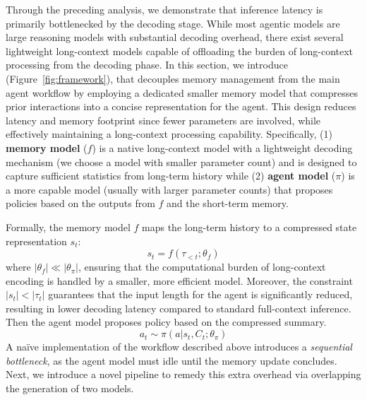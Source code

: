 Through the preceding analysis, we demonstrate that inference latency is primarily bottlenecked by the decoding stage.
While most agentic models are large reasoning models with substantial decoding overhead, there exist several lightweight long-context models capable of offloading the burden of long-context processing from the decoding phase.
In this section, we introduce {\model} (Figure~\ref{fig:framework}), that decouples memory management from the main agent workflow by employing a dedicated smaller memory model that compresses prior interactions into a concise representation for the agent.
This design reduces latency and memory footprint since fewer parameters are involved, while effectively maintaining a long-context processing capability.
Specifically, (1) \textbf{memory model} ($f$) is a native long-context model with a lightweight decoding mechanism (we choose a model with smaller parameter count) and is designed to capture sufficient statistics from long-term history while (2) \textbf{agent model} ($\pi$) is a more capable model (usually with larger parameter counts) that proposes policies based on the outputs from $f$ and the short-term memory.

Formally, the memory model $f$ maps the long-term history to a compressed state representation $s_t$:
\begin{equation}
    s_t = f({\tau}_{<t};\theta_f)
\end{equation}
where $|\theta_f| \ll |\theta_{\pi}|$, ensuring that the computational burden of long-context encoding is handled by a smaller, more efficient model. Moreover, the constraint $|s_t| < |{\tau}_t|$ guarantees that the input length for the agent is significantly reduced, resulting in lower decoding latency compared to standard full-context inference. Then the agent model proposes policy based on the compressed summary.
\begin{equation}
    a_t \sim \pi(a|s_t,C_t;\theta_{\pi})
\end{equation}
A na\"ive implementation of the workflow described above introduces a \emph{sequential bottleneck}, as the agent model must idle until the memory update concludes. Next, we introduce a novel pipeline to remedy this extra overhead via overlapping the generation of two models.

